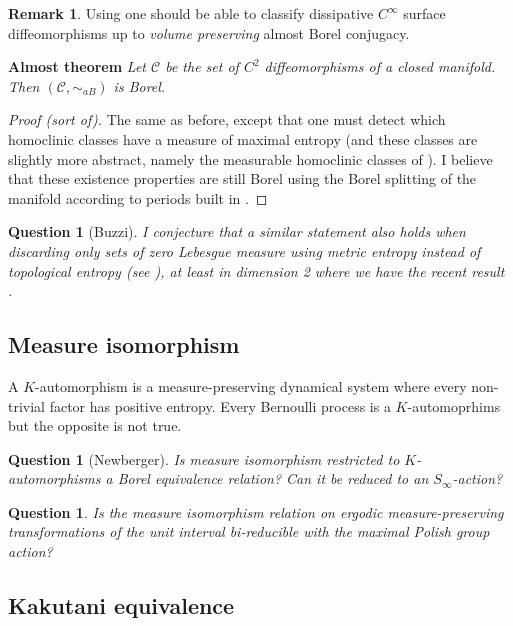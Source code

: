 \documentclass{article}
\newtheorem{question}[theorem]{Question}
\theoremstyle{definition}
\newtheorem{remark}[theorem]{Remark}
\begin{document}
\begin{remark}
Using \cite{Burguet} one should be able to classify dissipative $C^\infty$ surface diffeomorphisms up to \emph{volume preserving} almost Borel conjugacy.
\end{remark}

\textbf{Almost theorem}
\textit{Let $\mathscr C$ be the set of $C^2$ diffeomorphisms of a closed manifold.
Then $(\mathscr C,\sim_{aB})$ is Borel.}


\begin{proof}[Proof (sort of)]
The same as before, except that one must detect which homoclinic classes have a measure of maximal entropy (and these classes are slightly more abstract, namely the measurable homoclinic classes of \cite{BCS}). I believe that these existence properties are still Borel using the Borel splitting of the manifold according to periods built in \cite{BB}.
\end{proof}

\begin{question} [Buzzi]
I conjecture that a similar statement also holds when discarding only sets of zero Lebesgue measure using metric entropy instead of topological entropy (see \cite{HHTU}), at least in dimension 2 where we have the recent result \cite{Burguet}.
\end{question}






\subsection{Measure isomorphism}
A $K$-automorphism is a measure-preserving dynamical system where every non-trivial factor has positive entropy. Every Bernoulli process is a $K$-automoprhims but the opposite is not true. 
 \begin{question} [Newberger]
  Is measure isomorphism restricted to $K$-automorphisms a Borel equivalence relation? Can it be reduced to an $S_\infty$-action?
 \end{question}\label{OP7}


\begin{question} Is the measure isomorphism relation on ergodic measure-preserving transformations of the unit interval bi-reducible with the maximal Polish group action?
\end{question}

\subsection{Kakutani equivalence}
\end{document}
